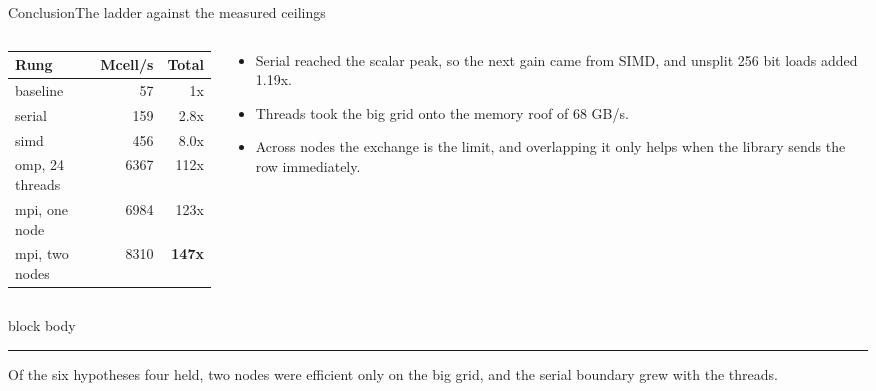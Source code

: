\documentclass[aspectratio=169,11pt]{beamer}
\newcommand{\nBase}{57}
\newcommand{\nSerial}{159}
\newcommand{\nSimd}{456}
\newcommand{\nOmp}{6367}
\newcommand{\nMpiOne}{6984}
\newcommand{\gSerial}{2.8}
\newcommand{\xSimd}{8.0}
\newcommand{\xOmp}{112}
\newcommand{\xMpiOne}{123}
\newcommand{\nMpiTwo}{8310}
\newcommand{\xMpiTwo}{147}
\newcommand{\splitGainOne}{1.19}
\newcommand{\sigcallout}[1]{%
  \vfill
  \begin{beamercolorbox}[wd=0.74\linewidth,sep=0.55em,rounded=true]{block body}
    \small{\color{sigblue}\rule{0.9ex}{0.9ex}}\hspace{0.5em}#1
  \end{beamercolorbox}%
}
\newcommand{\sigtable}[3]{%
  \begingroup
  \renewcommand{\arraystretch}{1.12}%
  \begin{table}\small
    \begin{tabular}{#1}
      \toprule
      #2 \\
      \midrule
      #3
      \bottomrule
    \end{tabular}
  \end{table}%
  \endgroup
}
\begin{document}
\begin{frame}{Conclusion}{The ladder against the measured ceilings}
  \vspace*{-0.4em}
  \begin{columns}[T,onlytextwidth]
    \begin{column}{0.47\textwidth}
      \sigtable{lrr}{\textbf{Rung} & \textbf{Mcell/s} & \textbf{Total}}{%
        baseline & \nBase & 1x \\
        serial & \nSerial & \gSerial x \\
        simd & \nSimd & \xSimd x \\
        omp, 24 threads & \nOmp & \xOmp x \\
        mpi, one node & \nMpiOne & \xMpiOne x \\
        \rowcolor{sigblue!12}
        mpi, two nodes & \nMpiTwo & \textbf{\xMpiTwo x} \\}
    \end{column}
    \begin{column}{0.5\textwidth}
      {\small
      \begin{itemize}
        \item Serial reached the scalar peak, so the next gain came from SIMD, and unsplit 256 bit loads added \splitGainOne x.
        \item Threads took the big grid onto the memory roof of 68 GB/s.
        \item Across nodes the exchange is the limit, and overlapping it only helps when the library sends the row immediately.
      \end{itemize}}
    \end{column}
  \end{columns}
  \sigcallout{Of the six hypotheses four held, two nodes were efficient
    only on the big grid, and the serial boundary grew with the threads.}
\end{frame}
\end{document}
